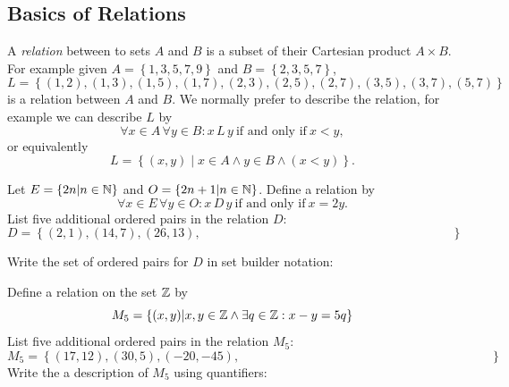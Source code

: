 \subsection*{Basics of Relations}
\begin{defn}[Relations]
    A \emph{relation} between to sets \(A\) and \(B\) is a subset of their Cartesian product \(A\times B\).  For example given \(A=\left\{1,3,5,7,9\right\}\) and \(B=\left\{2,3,5,7\right\}\),
    \[L=\left\{(1,2),(1,3),(1,5),(1,7),(2,3),(2,5),(2,7),(3,5),(3,7),(5,7)\right\}\]
    is a relation between \(A\) and \(B\).  We normally prefer to describe the relation, for example we can describe \(L\) by \[\forall x\in A\, \forall y\in B: x\, L\, y\ \text{if and only if}\ x<y,\]
    or equivalently \[L=\left\{(x,y)\middle|x\in A\wedge y\in B\wedge (x<y)\right\}.\]
\end{defn}

\begin{practiceprob}
    Let \(E=\left\{2n\middle|n\in\mbox{$\mathbb{N}$}\right\}\) and \(O=\left\{2n+1\middle|n\in\mbox{$\mathbb{N}$}\right\}\).  Define a relation by 
        \[\forall x\in E\, \forall y\in O: x\, D\, y\ \text{if and only if}\ x=2y.\]
    List five additional ordered pairs in the relation \(D\):
    {\large
        \[D=\left\{(2,1),(14,7),(26,13),\hspace{240pt}\right\}\]
    }

    Write the set of ordered pairs for \(D\) in set builder notation: \vspace{4\baselineskip}
\end{practiceprob}

\begin{practiceprob}
    Define a relation on the set \(\mbox{$\mathbb{Z}$}\) by 
    \begin{equation}\label{rel:mod5}
        M_5=\left\{(x,y)\middle|x,y\in\mbox{$\mathbb{Z}$} \wedge \exists q\in\mbox{$\mathbb{Z}$}: x-y=5q\right\}
    \end{equation}
    List five additional ordered pairs in the relation \(M_5\):
    {\large
        \[M_5=\left\{(17,12),(30,5),(-20,-45),\hspace{240pt}\right\}\]
    }
    Write the a description of \(M_5\) using quantifiers: \vspace{4\baselineskip}
\end{practiceprob}

\clearpage

